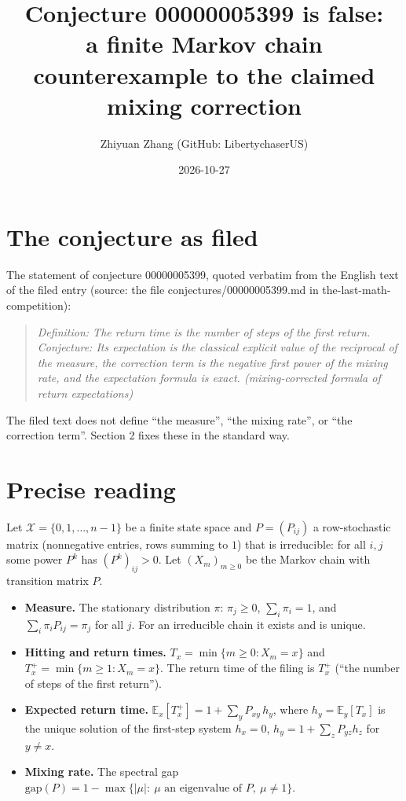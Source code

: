 \documentclass[11pt,a4paper]{article}
\title{Conjecture 00000005399 is false:\\ a finite Markov chain counterexample to the claimed mixing correction}
\author{Zhiyuan Zhang (GitHub: LibertychaserUS)}
\date{2026-10-27}
\begin{document}
\maketitle

\section{The conjecture as filed}

The statement of conjecture 00000005399, quoted verbatim from the English text of the filed entry (source: the file conjectures/00000005399.md in the-last-math-competition):

\begin{quote}
\textit{Definition: The return time is the number of steps of the first return. Conjecture: Its expectation is the classical explicit value of the reciprocal of the measure, the correction term is the negative first power of the mixing rate, and the expectation formula is exact. (mixing-corrected formula of return expectations)}
\end{quote}

The filed text does not define ``the measure'', ``the mixing rate'', or ``the correction term''. Section 2 fixes these in the standard way.

\section{Precise reading}

Let $\mathcal{X}=\{0,1,\dots,n-1\}$ be a finite state space and $P=(P_{ij})$ a row-stochastic matrix (nonnegative entries, rows summing to $1$) that is irreducible: for all $i,j$ some power $P^k$ has $(P^k)_{ij}>0$. Let $(X_m)_{m\ge 0}$ be the Markov chain with transition matrix $P$.

\begin{itemize}
\item \textbf{Measure.} The stationary distribution $\pi$: $\pi_j\ge 0$, $\sum_i\pi_i=1$, and $\sum_i \pi_i P_{ij}=\pi_j$ for all $j$. For an irreducible chain it exists and is unique.
\item \textbf{Hitting and return times.} $T_x=\min\{m\ge 0: X_m=x\}$ and $T_x^+=\min\{m\ge 1: X_m=x\}$. The return time of the filing is $T_x^+$ (``the number of steps of the first return'').
\item \textbf{Expected return time.} $\mathbb{E}_x[T_x^+]=1+\sum_y P_{xy}\,h_y$, where $h_y=\mathbb{E}_y[T_x]$ is the unique solution of the first-step system $h_x=0$, $h_y=1+\sum_z P_{yz}h_z$ for $y\neq x$.
\item \textbf{Mixing rate.} The spectral gap $\mathrm{gap}(P)=1-\max\{|\mu|:\ \mu \text{ an eigenvalue of } P,\ \mu\neq 1\}$.
\end{itemize}
\end{document}
